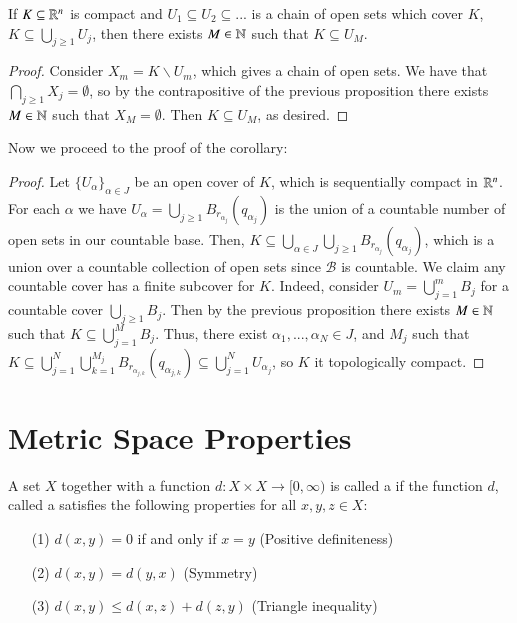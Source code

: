 \begin{proposition}
    If $K \subseteq \mathbb R^n$ is compact and $U_1\subseteq U_2\subseteq ...$ is a chain of open sets which cover $K$, $K \subseteq \bigcup_{j\geq 1}U_j$, then there exists $M \in \mathbb N$ such that $K \subseteq U_M$.
\end{proposition}
\begin{proof}
    Consider $X_m = K\backslash U_m$, which gives a chain of open sets. We have that $\bigcap_{j\geq 1}X_j = \emptyset$, so by the contrapositive of the previous proposition there exists $M \in \mathbb N$ such that $X_M = \emptyset$. Then $K \subseteq U_M$, as desired.
\end{proof}

Now we proceed to the proof of the corollary:

\begin{proof}
    Let $\{U_{\alpha}\}_{\alpha \in J}$ be an open cover of $K$, which is sequentially compact in $\mathbb R^n$. For each $\alpha$ we have $U_{\alpha} = \bigcup_{j\geq 1}B_{r_{\alpha_j}}(q_{\alpha_j})$ is the union of a countable number of open sets in our countable base. Then, $K \subseteq \bigcup_{\alpha \in J}\bigcup_{j\geq 1}B_{r_{\alpha_j}}(q_{\alpha_j})$, which is a union over a countable collection of open sets since $\mathcal{B}$ is countable. We claim any countable cover has a finite subcover for $K$. Indeed, consider $U_m = \bigcup_{j=1}^mB_j$ for a countable cover $\bigcup_{j\geq 1}B_j$. Then by the previous proposition there exists $M \in \mathbb N$ such that $K \subseteq \bigcup_{j=1}^MB_j$. Thus, there exist $\alpha_1,...,\alpha_N \in J$, and $M_j$ such that $K \subseteq \bigcup_{j=1}^N\bigcup_{k=1}^{M_j}B_{r_{\alpha_{j,k}}}(q_{\alpha_{j,k}}) \subseteq \bigcup_{j=1}^NU_{\alpha_j}$, so $K$ it topologically compact.
\end{proof}





\section{Metric Space Properties}

\begin{definition}
    A set $X$ together with a function $d:X\times X\rightarrow [0,\infty)$ is called a  if the function $d$, called a  satisfies the following properties for all $x,y,z \in X$:
    \begin{itemize}
        \item[(1)] $d(x,y) = 0$ if and only if $x = y$ (Positive definiteness)
        \item[(2)] $d(x,y) = d(y,x)$ (Symmetry) 
        \item[(3)] $d(x,y) \leq d(x,z) + d(z,y)$ (Triangle inequality)
    \end{itemize}
\end{definition}

